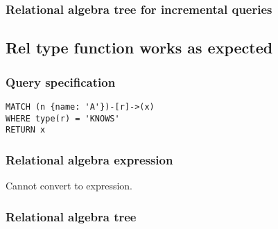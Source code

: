 \subsubsection*{Relational algebra tree for incremental queries}


\subsection{Rel type function works as expected}

\subsubsection*{Query specification}

\begin{lstlisting}
MATCH (n {name: 'A'})-[r]->(x)
WHERE type(r) = 'KNOWS'
RETURN x
\end{lstlisting}

\subsubsection*{Relational algebra expression}

Cannot convert to expression.

\subsubsection*{Relational algebra tree}

